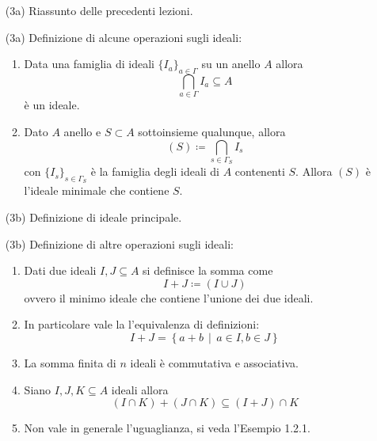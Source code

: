 \documentclass[italian]{article}
\begin{document}
    \begin{enumerate}
      \item[(3a)] Riassunto delle precedenti lezioni.
      \item[(3a)] Definizione di alcune operazioni sugli ideali:
      \begin{enumerate}
      	\item Data una famiglia di ideali $\{I_a\}_{a \in \Gamma}$ su un anello $A$ allora 
      	\begin{equation*}
	      	\bigcap_{a \in \Gamma} I_a \subseteq A
      	\end{equation*}
      	è un ideale.
      	\item Dato $A$ anello e $S \subset A$ sottoinsieme qualunque, allora 
      	\begin{equation*}
	      	(S) \coloneqq \bigcap_{s \in \Gamma_S} I_s 
      	\end{equation*} 
        con $\{I_s\}_{s \in \Gamma_S}$ è la famiglia degli ideali di $A$ contenenti $S$. Allora $(S)$ è l'ideale minimale che contiene $S$.
      \end{enumerate}
  	  \item[(3b)] Definizione di ideale principale.
  	  \item[(3b)] Definizione di altre operazioni sugli ideali:
  	  	\begin{enumerate}
  	  		\item Dati due ideali $I,J \subseteq A$ si definisce la somma come 
  	  			\begin{equation*}
  	  				I + J \coloneqq (I \cup J)
  	  			\end{equation*}
    		ovvero il minimo ideale che contiene l'unione dei due ideali.
    		\item In particolare vale la l'equivalenza di definizioni: 
    		\begin{equation*}
    			I + J = \left\{ a + b \,\middle|\, a \in I, b \in J \right\}
    		\end{equation*}
    		\item La somma finita di $n$ ideali è commutativa e associativa.
    		\item Siano $I, J, K \subseteq A$ ideali allora 
    		\begin{equation*}
	    		(I \cap K) + (J \cap K) \subseteq (I + J) \cap K 
    		\end{equation*}
    		\item Non vale in generale l'uguaglianza, si veda l'Esempio 1.2.1\cite{vergura}.
  	  	\end{enumerate}

\end{enumerate}
\end{document}

